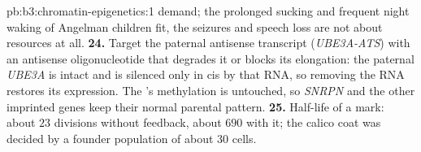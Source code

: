 \begin{solution}{pb:b3:chromatin-epigenetics:1}
demand; the prolonged sucking and frequent night waking of Angelman
children fit, the seizures and speech loss are not about resources at
all.
\textbf{24.} Target the paternal antisense transcript
(\emph{UBE3A-ATS}) with an antisense oligonucleotide that degrades it
or blocks its elongation: the paternal \emph{UBE3A} is intact and is
silenced only in cis by that RNA, so removing the RNA restores its
expression. The 's methylation is untouched,
so \emph{SNRPN} and the other imprinted genes keep their normal
parental pattern.
\textbf{25.} Half-life of a mark: about $23$ divisions without feedback,
about $690$ with it; the calico coat was decided by a founder population
of about $30$ cells.
\end{solution}
